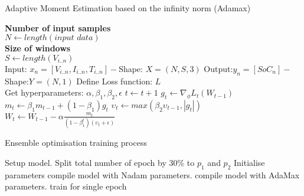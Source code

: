 \begin{algorithm}
  \caption{Adaptive Moment Estimation based on the infinity norm (Adamax)}
  \begin{algorithmic}[1]
    \STATE \textbf{Number of input samples} \\ $N\gets length(\textit{input data})$\\
    \STATE \textbf{Size of windows} \\ $S\gets length(V_{i..n})$\\
    \STATE Input: $x_n = [V_{i..n}, I_{i..n}, T_{i..n}] - $Shape: $X = (N, S, 3)$
    \STATE Output:$y_n = [SoC_{n}] - $Shape:$Y = (N, 1)$
    \STATE Define Loss function: $L$ \\
           Get hyperparameters: $\alpha, \beta_1, \beta_2, \epsilon$
    \STATE $t \gets t+1$
    \STATE $g_t \gets \nabla_\phi L_t (W_{t-1})$ 
    \STATE $m_t \gets \beta_1 m_{t-1}+(1-\beta_1) g_t $ 
    \STATE $\upsilon_t \gets max\left(\beta_2\upsilon_{t-1}, |g_t|\right) $ 
    \STATE $W_t \gets W_{t-1}- \alpha \frac{m_t}{(1-\beta^t_1)(\upsilon_t+\epsilon)} $ 
    \ENDWHILE
  \end{algorithmic}
  \label{alg:adamax}
\end{algorithm}
\begin{algorithm}
    \caption{Ensemble optimisation training process}
        \begin{algorithmic}[1]
            \STATE Setup model. Split total number of epoch by 30\% to $p_{1}$ and $p_{2}$
            \STATE Initialise parameters
                    \STATE {}
                    \STATE compile model with Nadam parameters. 
                \ELSE
                    \STATE {}
                    \STATE compile model with AdaMax parameters. 
                \ENDIF
                \STATE train for single epoch
            \ENDWHILE
        \end{algorithmic}
    \label{alg:ENS}
\end{algorithm}
